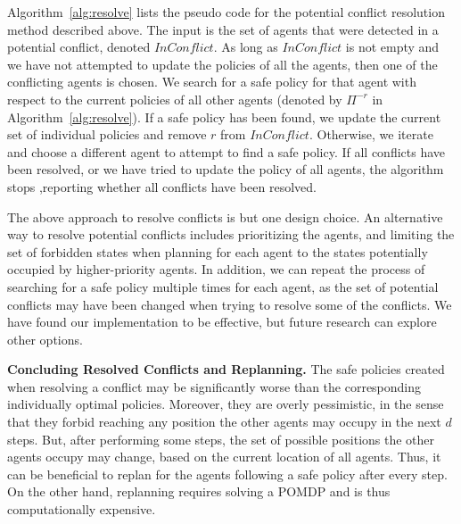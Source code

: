 \documentclass[letterpaper]{article} %
\newcommand{\inconflict}{\textit{InConflict}}
\newcommand{\roni}[1]{ }
\begin{document}
Algorithm~\ref{alg:resolve} lists the pseudo code for the potential conflict resolution method described above. 
The input is the set of agents that were detected in a potential conflict, denoted $\inconflict$. 
As long as $\inconflict$ is not empty and we have not attempted to update the policies of all the agents, 
then one of the conflicting agents is chosen. 
We search for a safe policy for that agent with respect to the current policies of all other agents (denoted by $\Pi^{-r}$ in Algorithm~\ref{alg:resolve}). 
If a safe policy has been found, we update the current set of individual policies and remove $r$ from $\inconflict$. 
Otherwise, we iterate and choose a different agent to attempt to find a safe policy. 
If all conflicts have been resolved, or we have tried to update the policy of all agents, the algorithm stops ,reporting whether all conflicts have been resolved. 
\roni{If space is an issue, consider removing the above paragraph and pseudo-code}




The above approach to resolve conflicts is but one design choice. 
An alternative way to resolve potential conflicts includes prioritizing the agents, and limiting the set of forbidden states when planning for each agent to the states potentially occupied by higher-priority agents. In addition, we can repeat the process of searching for a safe policy multiple times for each agent, as the set of potential conflicts may have been changed when trying to resolve some of the conflicts. We have found our implementation to be effective, but future research can explore other options. 


\noindent\textbf{Concluding Resolved Conflicts and Replanning.} 
The safe policies created when resolving a conflict may be significantly worse than the corresponding individually optimal policies. Moreover, they are overly pessimistic, in the sense that they forbid reaching any position the other agents may occupy in the next $d$ steps. But, after performing some steps, the set of possible positions the other agents occupy may change, based on the current location of all agents. Thus, it can be beneficial to replan for the agents following a safe policy after every step. On the other hand, replanning requires solving a POMDP and is thus computationally expensive. 
\end{document}
